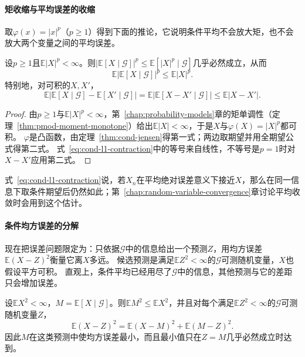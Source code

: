 \paragraph{矩收缩与平均误差的收缩}
取$\varphi(x)=|x|^p$（$p\geq1$）得到下面的推论，它说明条件平均不会放大矩，也不会放大两个变量之间的平均误差。

\begin{theorem}[推论：条件期望的收缩]
\label{thm:cond-contraction}
设$p\geq1$且$\mathbb E|X|^p<\infty$。则$|\mathbb E[X\mid\mathcal G]|^p\leq\mathbb E[|X|^p\mid\mathcal G]$几乎必然成立，从而
\[
  \mathbb E\bigl|\mathbb E[X\mid\mathcal G]\bigr|^p\leq\mathbb E|X|^p.
\]
特别地，对可积的$X,X'$，
\begin{equation}
  \mathbb E\bigl|\mathbb E[X\mid\mathcal G]-\mathbb E[X'\mid\mathcal G]\bigr|=\mathbb E\bigl|\mathbb E[X-X'\mid\mathcal G]\bigr|\leq\mathbb E|X-X'|.
  \label{eq:cond-l1-contraction}
\end{equation}
\end{theorem}

\begin{proof}
由$p\geq1$与$\mathbb E|X|^p<\infty$，第~\ref{chap:probability-models}章的矩单调性（定理~\ref{thm:pmod-moment-monotone}）给出$\mathbb E|X|<\infty$，于是$X$与$\varphi(X)=|X|^p$都可积。
$\varphi$是凸函数，由定理~\ref{thm:cond-jensen}得第一式；两边取期望并用全期望公式得第二式。
式~\eqref{eq:cond-l1-contraction}中的等号来自线性，不等号是$p=1$时对$X-X'$应用第二式。
\end{proof}

式~\eqref{eq:cond-l1-contraction}说，若$X_n$在平均绝对误差意义下接近$X$，那么在同一信息下取条件期望后仍然如此；第~\ref{chap:random-variable-convergence}章讨论平均收敛时会用到这个估计。

\paragraph{条件均方误差的分解}
现在把误差问题限定为：只依据$\mathcal G$中的信息给出一个预测$Z$，用均方误差$\mathbb E(X-Z)^2$衡量它离$X$多远。
候选预测是满足$\mathbb EZ^2<\infty$的$\mathcal G$可测随机变量，$X$也假设平方可积。
直观上，条件平均已经用尽了$\mathcal G$中的信息，其他预测与它的差距只会增加误差。

\begin{theorem}[条件均方误差最小]
\label{thm:cond-mse}
设$\mathbb EX^2<\infty$，$M=\mathbb E[X\mid\mathcal G]$。则$\mathbb EM^2\leq\mathbb EX^2$，并且对每个满足$\mathbb EZ^2<\infty$的$\mathcal G$可测随机变量$Z$，
\begin{equation}
  \mathbb E(X-Z)^2=\mathbb E(X-M)^2+\mathbb E(M-Z)^2.
  \label{eq:cond-mse-decomposition}
\end{equation}
因此$M$在这类预测中使均方误差最小，而且最小值只在$Z=M$几乎必然成立时达到。
\end{theorem}

